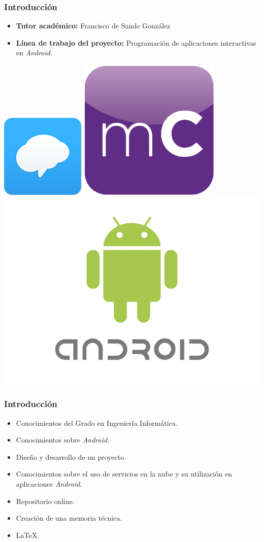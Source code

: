 \begin{frame}
    \frametitle{Introducción}
    \begin{itemize}
	\item \textbf{Tutor académico:} Francisco de Sande González
        \item \textbf{Línea de trabajo del proyecto:} Programación de aplicaciones interactivas en {\it Android}.
    \end{itemize}
        {\inserttitlegraphic\par}
		\vfill \includegraphics[width=0.2\linewidth]{Images/logos/remind_logo_2}
		\hfill %
		\includegraphics[width=0.2\linewidth]{Images/logos/miColegioApp}
		\hfill \includegraphics[width=0.35\linewidth]{Images/logos/android_logo}
\end{frame}
\begin{frame}
	\frametitle{Introducción}
		\begin{itemize}
			\item Conocimientos del Grado en Ingeniería Informática.
			\item Conocimientos sobre {\it Android}.
			\item Diseño y desarrollo de un proyecto.
			\item Conocimientos sobre el uso de servicios en la nube y su utilización en aplicaciones {\it Android}.
			\item Repositorio online.
			\item Creación de una memoria técnica.
			\item \LaTeX{}.
		\end{itemize}
	\endblock{}
\end{frame}
